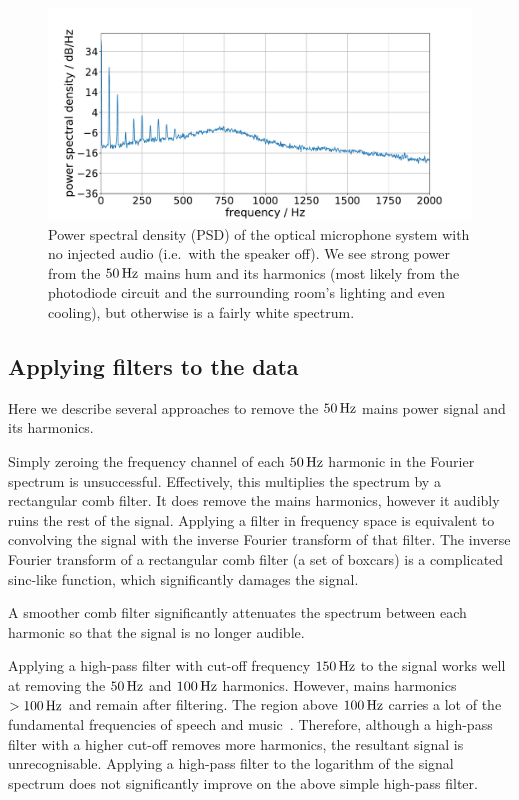 \documentclass[paper-main.tex]{subfiles}
\begin{document}
\begin{figure}
	\includegraphics[width=.49\textwidth]{figures/podo_noise_psd_zoom-cropped.pdf}
	\caption{Power spectral density (PSD) of the optical microphone system with no injected audio (i.e.\ with the speaker off). We see strong power from the $50\,{\rm Hz}$ mains hum and its harmonics (most likely from the photodiode circuit and the surrounding room’s lighting and even cooling), but otherwise is a fairly white spectrum.}
	\label{fig:psd_noise}
\end{figure}


\subsection{Applying filters to the data}
\label{sec:simple_filters}

Here we describe several approaches to remove the $50\,{\rm Hz}$ mains power signal and its harmonics. 

Simply zeroing the frequency channel of each $50\,{\rm Hz}$ harmonic in the Fourier spectrum is unsuccessful. 
Effectively, this multiplies the spectrum by a rectangular comb filter. 
It does remove the mains harmonics, however it audibly ruins the rest of the signal. 
Applying a filter in frequency space is equivalent to convolving the signal with the inverse Fourier transform of that filter. 
The inverse Fourier transform of a rectangular comb filter (a set of boxcars) is a complicated sinc-like function, which significantly damages the signal. 


A smoother comb filter significantly attenuates the spectrum between each harmonic so that the signal is no longer audible. 


Applying a high-pass filter with cut-off frequency $150\,{\rm Hz}$ to the signal works well at removing the $50\,{\rm Hz}$ and $100\,{\rm Hz}$ harmonics.
However, mains harmonics $> 100\,{\rm Hz}$ and remain after filtering. 
The region above $100\,{\rm Hz}$ carries a lot of the fundamental frequencies of speech and music~\cite{speech_intelligibility}. 
Therefore, although a high-pass filter with a higher cut-off removes more harmonics, the resultant signal is unrecognisable. 
Applying a high-pass filter to the logarithm of the signal spectrum does not significantly improve on the above simple high-pass filter.
\end{document}
